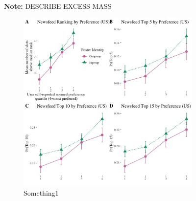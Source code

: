 \documentclass[12pt,letterpaper]{article}
\begin{document}
\begin{figure}[ht]
\footnotesize \textbf{Note:} DESCRIBE EXCESS MASS
\end{figure}

\begin{figure}[ht]
\caption{NF Beautiful Results}
\label{fig:nf_main}
    \begin{subfigure}{.5\textwidth} 
        \centering
        \includegraphics[width=1\linewidth]{Output/Graphs/Audit/Ranking line graphs/US NF all outcomes panel by norm preference by ingroup.jpg} 
        \caption{Something1}
        \label{fig:nf_line}
        \end{subfigure}
    \begin{subfigure}{.5\textwidth}
        \centering

\end{subfigure}
\end{figure}
\end{document}
